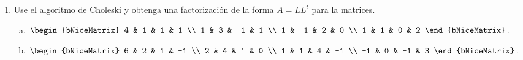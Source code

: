 \documentclass[
	spanish,
	8pt,
	utf8,
	xcolor=table,
	handout,
	aspectratio=169,
	professionalfonts,
	notheorems,
	mathserif,
]{beamer}
\newcounter{savedenum}
\newcommand*{\saveenum}{\setcounter{savedenum}{\theenumi}}
\begin{document}
\begin{frame}
\begin{enumerate}
		\item

		      Use el algoritmo de Choleski y obtenga una factorización de
		      la forma $A=LL^{t}$ para la matrices.


		      \begin{multicols}{2}
			      \begin{enumerate}[a)]
				      \item

				            \begin{math}
					            \begin{bNiceMatrix}
						            4 & 1  & 1  & 1 \\
						            1 & 3  & -1 & 1 \\
						            1 & -1 & 2  & 0 \\
						            1 & 1  & 0  & 2
					            \end{bNiceMatrix}
				            \end{math}.

				      \item

				            \begin{math}
					            \begin{bNiceMatrix}
						            6  & 2 & 1  & -1 \\
						            2  & 4 & 1  & 0  \\
						            1  & 1 & 4  & -1 \\
						            -1 & 0 & -1 & 3
					            \end{bNiceMatrix}
				            \end{math}.
			      \end{enumerate}
		      \end{multicols}
		      \saveenum
	\end{enumerate}
\end{frame}
\end{document}
